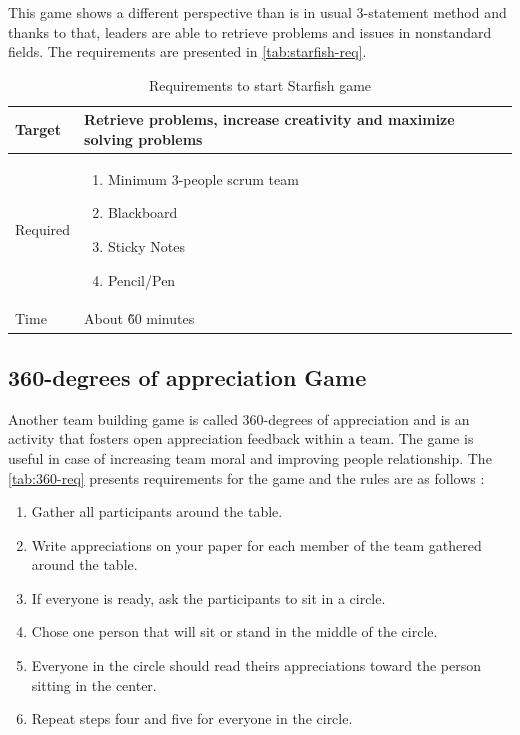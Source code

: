 This game shows a different perspective than is in usual 3-statement method and thanks to that, leaders are able to retrieve problems and issues in nonstandard fields. The requirements are presented in \autoref{tab:starfish-req}.

\begin{table}[h]
	\caption{Requirements to start Starfish game}
	\label{tab:starfish-req}
	\begin{tabularx}{\textwidth}{|X|X|}
	\hline
		Target & Retrieve problems, increase creativity and maximize solving problems  \\ \hline
		Required			& \begin{enumerate}
		    \item Minimum 3-people scrum team
		    \item Blackboard
		    \item Sticky Notes
		    \item Pencil/Pen
		\end{enumerate}	 \\ \hline
		Time & About \~60 minutes \\ \hline

	\end{tabularx}
\end{table}

\subsection{360-degrees of appreciation Game}
\label{subch:360Game}
Another team building game is called 360-degrees of appreciation and is an activity that fosters open appreciation feedback within a team. The game is useful in case of increasing team moral and improving people relationship. The \autoref{tab:360-req} presents requirements for the game and the rules are as follows  \cite{360Bibliography}:
\begin{enumerate}
    \item Gather all participants around the table.
    \item Write appreciations on your paper for each member of the team gathered around the table.
    \label{it:apprTabTimeWritting360}
    \item If everyone is ready, ask the participants to sit in a circle.
    \item Chose one person that will sit or stand in the middle of the circle.
    \item Everyone in the circle should read theirs appreciations toward the person sitting in the center.
    \label{it:apprTabTimeTalking360}
    \item Repeat steps four and five for everyone in the circle.
\end{enumerate}

